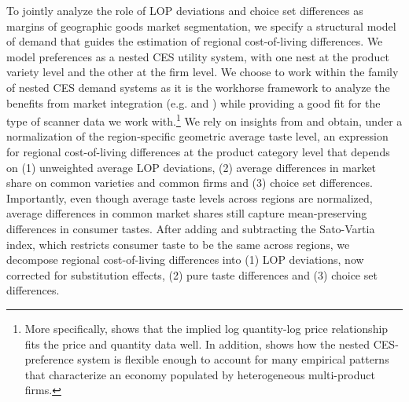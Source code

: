 To jointly analyze the role of LOP deviations and choice set differences as margins of geographic goods market segmentation, we specify a structural model of demand that guides the estimation of regional cost-of-living differences. We model preferences as a nested CES utility system, with one nest at the product variety level and the other at the firm level. We choose to work within the family of nested CES demand systems as it is the workhorse framework to analyze the benefits from market integration (e.g. \citet{Broda2006} and \citet{Arkolakis2012}) while providing a good fit for the type of scanner data we work with.\footnote{More specifically, \citet{Dellavigna2019} shows that the implied log quantity-log price relationship fits the price and quantity data well. In addition, \citet{Hottman2016} shows how the nested CES-preference system is flexible enough to account for many empirical patterns that characterize an economy populated by heterogeneous multi-product firms.} We rely on insights from \citet{Redding2020} and obtain, under a normalization of the region-specific geometric average taste level, an expression for regional cost-of-living differences at the product category level that depends on (1) unweighted average LOP deviations, (2) average differences in market share on common varieties and common firms and (3) choice set differences. Importantly, even though average taste levels across regions are normalized, average differences in common market shares still capture mean-preserving differences in consumer tastes. After adding and subtracting the Sato-Vartia index, which restricts consumer taste to be the same across regions, we decompose regional cost-of-living differences into (1) LOP deviations, now corrected for substitution effects, (2) pure taste differences and (3) choice set differences. 

